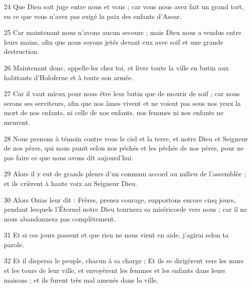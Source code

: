 \par 24 Que Dieu soit juge entre nous et vous ; car vous nous avez fait un grand tort, en ce que vous n'avez pas exigé la paix des enfants d'Assur.
\par 25 Car maintenant nous n'avons aucun secours ; mais Dieu nous a vendus entre leurs mains, afin que nous soyons jetés devant eux avec soif et une grande destruction.
\par 26 Maintenant donc, appelle-les chez toi, et livre toute la ville en butin aux habitants d'Holoferne et à toute son armée.
\par 27 Car il vaut mieux pour nous être leur butin que de mourir de soif ; car nous serons ses serviteurs, afin que nos âmes vivent et ne voient pas sous nos yeux la mort de nos enfants, ni celle de nos enfants. nos femmes ni nos enfants ne meurent.
\par 28 Nous prenons à témoin contre vous le ciel et la terre, et notre Dieu et Seigneur de nos pères, qui nous punit selon nos péchés et les péchés de nos pères, pour ne pas faire ce que nous avons dit aujourd'hui.
\par 29 Alors il y eut de grands pleurs d'un commun accord au milieu de l'assemblée ; et ils crièrent à haute voix au Seigneur Dieu.
\par 30 Alors Ozias leur dit : Frères, prenez courage, supportons encore cinq jours, pendant lesquels l'Éternel notre Dieu tournera sa miséricorde vers nous ; car il ne nous abandonnera pas complètement.
\par 31 Et si ces jours passent et que rien ne nous vient en aide, j'agirai selon ta parole.
\par 32 Et il dispersa le peuple, chacun à sa charge ; Et ils se dirigèrent vers les murs et les tours de leur ville, et envoyèrent les femmes et les enfants dans leurs maisons ; et ils furent très mal amenés dans la ville.


